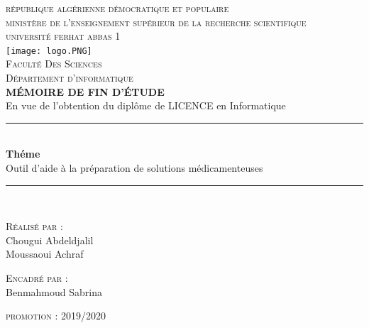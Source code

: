 \documentclass[12pt, openany]{report}
\newcommand{\HRule}{\rule{\linewidth}{0.5mm}}
\begin{document}
\begin{titlepage}
  \begin{sffamily}
  \begin{center}


    \textsc{\large république algérienne démocratique et populaire}\\[0.2cm]
    \textsc{\large ministère de l'enseignement supérieur de la recherche scientifique}\\[0.2cm] 
	\textsc{\large université ferhat abbas 1}\\[0.8cm]
	
	\texttt{[image: logo.PNG]}~\\[0.5cm]
	\textsc{\Large Faculté Des Sciences}\\[0.2cm]
	\textsc{\Large Département d'informatique}\\ [0.8cm]

    
    \textsf{   \Huge   \bfseries MÉMOIRE DE FIN D'ÉTUDE}\\ [0.4cm]
    \textsf{  \LARGE   En vue de l'obtention du diplôme de LICENCE en Informatique}\\[1.2cm]
 	\HRule \\[0.4cm]
 	\textsf{ \Huge \textbf{Théme}}\\[0.5cm]
 	\textsf{\LARGE Outil d'aide à la préparation de solutions médicamenteuses}
    \HRule \\[3cm]

    \begin{minipage}{0.5\textwidth}
      \begin{flushleft} \Large \raggedright
        \textsc{Réalisé par :}\\
      
       	\textsf{Chougui Abdeldjalil \\ Moussaoui Achraf}
       	
       
      \end{flushleft}
    \end{minipage}
    \begin{minipage}{0.4\textwidth}
      \begin{flushright} \Large \raggedright

        \textsc{  Encadré par  : }\\ \textsf{ Benmahmoud Sabrina  }
      \end{flushright}
    \end{minipage}

    \vfill

    {\large \textsc{promotion : 2019/2020}}

  \end{center}
  \end{sffamily}
\end{titlepage}
\end{document}
